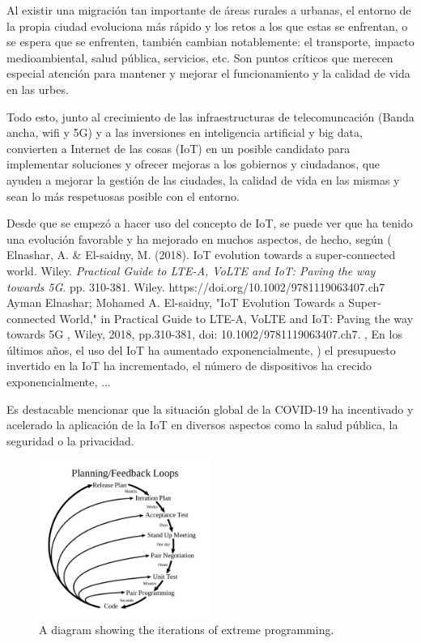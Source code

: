 \documentclass[12pt, a4paper, twoside]{article}
\begin{document}
Al existir una migración tan importante de áreas rurales a urbanas, el entorno de la
propia ciudad evoluciona más rápido y los retos a los que estas se enfrentan, o se espera que se enfrenten,
también cambian notablemente: el transporte, impacto medioambiental, salud pública, servicios, etc. Son puntos
críticos que merecen especial atención para mantener y mejorar el funcionamiento y la calidad de vida en
las urbes.

Todo esto, junto al crecimiento de las infraestructuras de telecomuncación (Banda ancha, wifi y 5G)
y a las inversiones en inteligencia artificial y big data, convierten  a Internet de las cosas (IoT)
 en un posible candidato para implementar soluciones y ofrecer mejoras a los gobiernos y ciudadanos, 
que ayuden a mejorar la gestión de las ciudades, la calidad de vida en las mismas y 
sean lo más respetuosas posible con el entorno.

Desde que se empezó a hacer uso del concepto de IoT, se puede ver que ha tenido una evolución favorable
 y ha mejorado en muchos aspectos,
de hecho, según (
    Elnashar, A. \& El-saidny, M. (2018). IoT evolution towards a super-connected world. Wiley. \textit{Practical Guide to LTE-A, VoLTE and IoT: Paving the way towards 5G}. pp. 310-381. Wiley. https://doi.org/10.1002/9781119063407.ch7
  Ayman Elnashar; Mohamed A. El-saidny, "IoT Evolution Towards a Super‐connected World," in Practical Guide to LTE-A, VoLTE and IoT: Paving the way towards 5G , Wiley, 2018, pp.310-381, doi: 10.1002/9781119063407.ch7.
  , En los últimos años, el uso del IoT ha aumentado exponencialmente,
  )
  el presupuesto invertido en la IoT ha incrementado, el número de dispositivos ha crecido
exponencialmente, ...

Es destacable mencionar que la situación global de la COVID-19 ha incentivado y acelerado la aplicación
de la IoT en diversos aspectos como la salud pública, la seguridad o la privacidad.

    \begin{figure}[h]
      \centering
        \includegraphics[width=0.5\textwidth]{xp}
      \caption{A diagram showing the iterations of extreme programming.}
    \end{figure}
    
\end{document}
